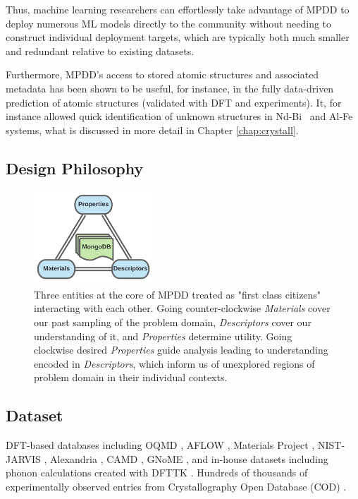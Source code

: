 Thus, machine learning researchers can effortlessly take advantage of MPDD to deploy numerous ML models directly to the community without needing to construct individual deployment targets, which are typically both much smaller and redundant relative to existing datasets.

Furthermore, MPDD's access to stored atomic structures and associated metadata has been shown to be useful, for instance, in the fully data-driven prediction of atomic structures (validated with DFT and experiments). It, for instance allowed quick identification of unknown structures in Nd-Bi~\cite{Im2022ThermodynamicModeling} and Al-Fe~\cite{Shang2021FormingJoints} systems, what is discussed in more detail in Chapter \ref{chap:crystall}.

\subsection{Design Philosophy} \label{mpdd:ssec:designphilosophy}

\begin{figure}[H]
    \centering
    \includegraphics[width=0.4\textwidth]{mpdd/MPDD_CoreTriplet.png}
    \caption{Three entities at the core of MPDD treated as "first class citizens" interacting with each other. Going counter-clockwise \emph{Materials} cover our past sampling of the problem domain, \emph{Descriptors} cover our understanding of it, and \emph{Properties} determine utility. Going clockwise desired \emph{Properties} guide analysis leading to understanding encoded in \emph{Descriptors}, which inform us of unexplored regions of problem domain in their individual contexts.}
    \label{mpdd:fig:core}
\end{figure}



\subsection{Dataset} \label{mpdd:ssec:dataset}

DFT-based databases including OQMD \cite{Saal2013MaterialsOQMD, Kirklin2015TheEnergies, Shen2022ReflectionsOQMD}, AFLOW \cite{Curtarolo2013AFLOW:Discovery, Toher2018TheDiscovery}, Materials Project \cite{Jain2013Commentary:Innovation}, NIST-JARVIS \cite{Choudhary2020TheDesign}, Alexandria \cite{Schmidt2022AFunctionals}, CAMD \cite{Ye2022NovelAgents}, GNoME \cite{Merchant2023ScalingDiscovery}, and in-house datasets including phonon calculations created with DFTTK \cite{Wang2021DFTTK:Calculations}. Hundreds of thousands of experimentally observed entries from Crystallography Open Database (COD) \cite{Grazulis2009CrystallographyStructures, Grazulis2012CrystallographyCollaboration, Grazulis2019CrystallographyPerspectives}.


